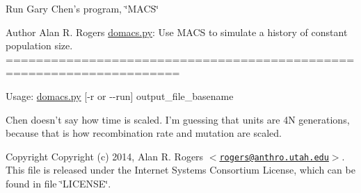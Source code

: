 \-Run \-Gary \-Chen's program, \char`\"{}\-M\-A\-C\-S\char`\"{}

\begin{DoxyAuthor}{\-Author}
\-Alan \-R. \-Rogers \hyperlink{domacs_8py}{domacs.\-py}\-: \-Use \-M\-A\-C\-S to simulate a history of constant population size. =====================================================================
\end{DoxyAuthor}
\-Usage\-: \hyperlink{domacs_8py}{domacs.\-py} \mbox{[}-\/r or -\/-\/run\mbox{]} output\-\_\-file\-\_\-basename

\-Chen doesn't say how time is scaled. \-I'm guessing that units are 4\-N generations, because that is how recombination rate and mutation are scaled.

\begin{DoxyCopyright}{\-Copyright}
\-Copyright (c) 2014, \-Alan \-R. \-Rogers $<$\href{mailto:rogers@anthro.utah.edu}{\tt rogers@anthro.\-utah.\-edu}$>$. \-This file is released under the \-Internet \-Systems \-Consortium \-License, which can be found in file \char`\"{}\-L\-I\-C\-E\-N\-S\-E\char`\"{}. 
\end{DoxyCopyright}
